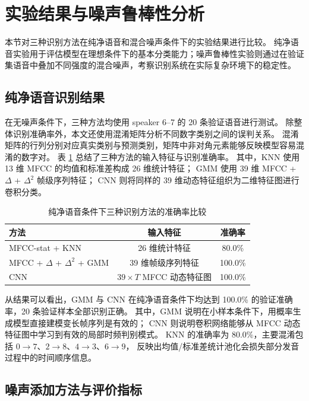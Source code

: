 \section{实验结果与噪声鲁棒性分析}

本节对三种识别方法在纯净语音和混合噪声条件下的实验结果进行比较。
纯净语音实验用于评估模型在理想条件下的基本分类能力；噪声鲁棒性实验则通过在验证集语音中叠加不同强度的混合噪声，考察识别系统在实际复杂环境下的稳定性。

\subsection{纯净语音识别结果}

在无噪声条件下，三种方法均使用 speaker 6--7 的 20 条验证语音进行测试。
除整体识别准确率外，本文还使用混淆矩阵分析不同数字类别之间的误判关系。
混淆矩阵的行列分别对应真实类别与预测类别，矩阵中非对角元素能够反映模型容易混淆的数字对\cite{zhihu_confusion_matrix}。
表 \ref{tab:clean-result-compare} 总结了三种方法的输入特征与识别准确率。
其中，KNN 使用 13 维 MFCC 的均值和标准差构成 26 维统计特征；
GMM 使用 39 维 MFCC + $\Delta$ + $\Delta^2$ 帧级序列特征；
CNN 则将同样的 39 维动态特征组织为二维特征图进行卷积分类。

\begin{table}[H]
  \centering
  \caption{纯净语音条件下三种识别方法的准确率比较}
  \label{tab:clean-result-compare}
  \begin{tabular}{lcc}
    \toprule
    方法 & 输入特征 & 准确率 \\
    \midrule
    MFCC-stat + KNN & 26 维统计特征 & 80.0\% \\
    MFCC + $\Delta$ + $\Delta^2$ + GMM & 39 维帧级序列特征 & 100.0\% \\
    CNN & $39 \times T$ MFCC 动态特征图 & 100.0\% \\
    \bottomrule
  \end{tabular}
\end{table}

从结果可以看出，GMM 与 CNN 在纯净语音条件下均达到 100.0\% 的验证准确率，20 条验证样本全部识别正确。
其中，GMM 说明在小样本条件下，用概率生成模型直接建模变长帧序列是有效的；
CNN 则说明卷积网络能够从 MFCC 动态特征图中学习到有效的局部时频判别模式。
KNN 的准确率为 80.0\%，主要混淆包括 $0 \rightarrow 7$、$2 \rightarrow 8$、$4 \rightarrow 3$、$6 \rightarrow 9$，
反映出均值/标准差统计池化会损失部分发音过程中的时间顺序信息。

\subsection{噪声添加方法与评价指标}

